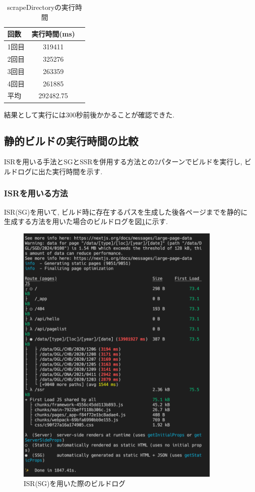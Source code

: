 \begin{table}[hbtp]
	\caption{scrapeDirectoryの実行時間}
	\label{table:data_type}
	\centering
	\begin{tabular}{lcr}
		\hline
		回数  & 実行時間(ms)   \\
		\hline \hline
		1回目 & 319411     \\
		2回目 & 325276     \\
		3回目 & 263359     \\
		4回目 & 261885     \\
		\hline
		平均  & 292482.75
	\end{tabular}
\end{table}

結果として実行には300秒前後かかることが確認できた.

\subsection{静的ビルドの実行時間の比較}
ISRを用いる手法とSGとSSRを併用する方法との2パターンでビルドを実行し, ビルドログに出た実行時間を示す.
\subsubsection{ISRを用いる方法}
ISR(SG)を用いて, ビルド時に存在するパスを生成した後各ページまでを静的に生成する方法を用いた場合のビルドログを図\ref{fig:ISR-build}に示す.

\begin{figure}[htbp]
	\begin{center}
		\includegraphics[width=100mm]{ISR.png}
		\caption{ISR(SG)を用いた際のビルドログ}\label{fig:ISR-build}
	\end{center}
\end{figure}

